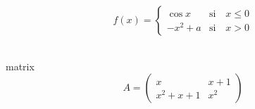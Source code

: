 $$f(x) = 
\begin{cases}
\cos x & \text{si } \text{ } x \leq 0\\
-x^2+a  & \text{si } \text{ } x > 0
\end{cases}
$$

\\matrix
$$A = 
\begin{pmatrix}
x & x+1 \\
x^{2}+x+1 & x^{2}
\end{pmatrix}
$$
